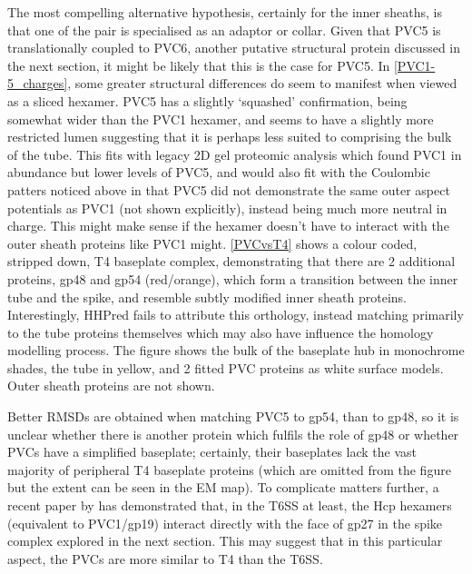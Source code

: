 The most compelling alternative hypothesis, certainly for the inner sheaths, is that one of the pair is specialised as an adaptor or collar. Given that PVC5 is translationally coupled to PVC6, another putative structural protein discussed in the next section, it might be likely that this is the case for PVC5. In \vref{PVC1-5_charges}, some greater structural differences do seem to manifest when viewed as a sliced hexamer. PVC5 has a slightly `squashed' confirmation, being somewhat wider than the PVC1 hexamer, and seems to have a slightly more restricted lumen suggesting that it is perhaps less suited to comprising the bulk of the tube. This fits with legacy 2D gel proteomic analysis which found PVC1 in abundance but lower levels of PVC5, and would also fit with the Coulombic patters noticed above in that PVC5 did not demonstrate the same outer aspect potentials as PVC1 (not shown explicitly), instead being much more neutral in charge. This might make sense if the hexamer doesn't have to interact with the outer sheath proteins like PVC1 might. \vref{PVCvsT4} shows a colour coded, stripped down, T4 baseplate complex, demonstrating that there are 2 additional proteins, gp48 and gp54 (red/orange), which form a transition between the inner tube and the spike, and resemble subtly modified inner sheath proteins. Interestingly, HHPred fails to attribute this orthology, instead matching primarily to the tube proteins themselves which may also have influence the homology modelling process. The figure shows the bulk of the baseplate hub in monochrome shades, the tube in yellow, and 2 fitted PVC proteins as white surface models. Outer sheath proteins are not shown.

Better RMSDs are obtained when matching PVC5 to gp54, than to gp48, so it is unclear whether there is another protein which fulfils the role of gp48 or whether PVCs have a simplified baseplate; certainly, their baseplates lack the vast majority of peripheral T4 baseplate proteins (which are omitted from the figure but the extent can be seen in the EM map). To complicate matters further, a recent paper by \cite{Renault2018} has demonstrated that, in the T6SS at least, the Hcp hexamers (equivalent to PVC1/gp19) interact directly with the face of gp27 in the spike complex explored in the next section. This may suggest that in this particular aspect, the PVCs are more similar to T4 than the T6SS.

